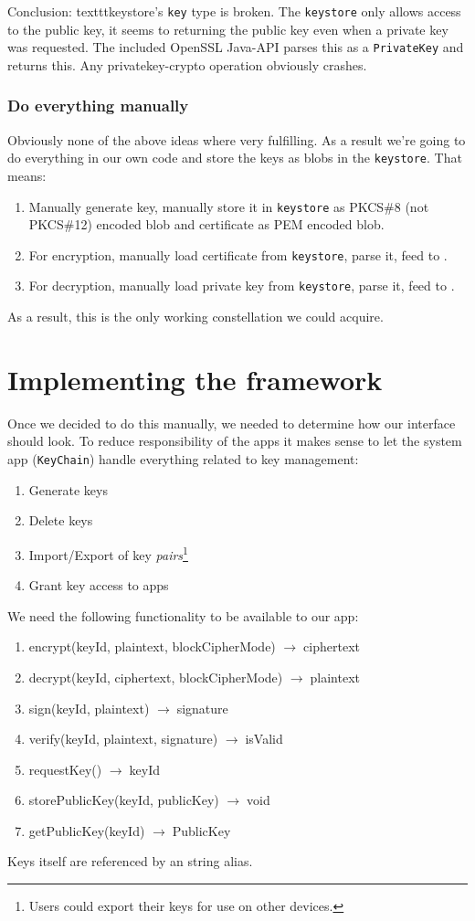 \documentclass[a4paper,draft]{scrartcl}
\newcommand{\totype}{\(\to\;\)}
\begin{document}
			Conclusion:
			texttt{keystore}'s \texttt{key} type is broken. The \texttt{keystore} only allows access to the public key, it seems to returning the public key even when a private key was requested. The included OpenSSL Java-API parses this as a \texttt{PrivateKey} and returns this. Any privatekey-crypto operation obviously crashes.
		
		\subsubsection{Do everything manually}
			Obviously none of the above ideas where very fulfilling. As a result we're going to do everything in our own code and store the keys as blobs in the \texttt{keystore}. That means:
			\begin{enumerate}
				\item Manually generate key, manually store it in \texttt{keystore} as PKCS\#8 (not PKCS\#12) encoded blob and certificate as PEM encoded blob.
				\item For encryption, manually load certificate from \texttt{keystore}, parse it, feed to .
				\item For decryption, manually load private key from \texttt{keystore}, parse it, feed to .
			\end{enumerate}
			As a result, this is the only working constellation we could acquire.

\section{Implementing the framework}
	Once we decided to do this manually, we needed to determine how our interface should look. To reduce responsibility of the apps it makes sense to let the system app (\texttt{KeyChain}) handle everything related to key management:
	\begin{enumerate}
		\item Generate keys
		\item Delete keys
		\item Import/Export of key {\em pairs}\footnote{Users could export their keys for use on other devices.}
		\item Grant key access to apps
	\end{enumerate}

	We need the following functionality to be available to our app:
	\begin{enumerate}
	\tt
		\item encrypt(keyId, plaintext, blockCipherMode) \totype ciphertext
		\item decrypt(keyId, ciphertext, blockCipherMode) \totype plaintext
		\item sign(keyId, plaintext) \totype signature
		\item verify(keyId, plaintext, signature) \totype isValid
		\item requestKey() \totype keyId
		\item storePublicKey(keyId, publicKey) \totype void
		\item getPublicKey(keyId) \totype PublicKey
	\end{enumerate}
	Keys itself are referenced by an string alias.
\end{document}
